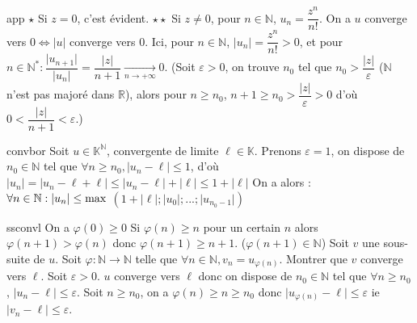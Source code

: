 \documentclass[12pt,a4paper]{report}
\begin{document}
\begin{demonstration}{app}
$\star$ \; Si $z=0$, c'est évident. \newline
$\star \star$ Si $z \neq 0$, pour $n \in \mathbb{N}$, $u_n=\dfrac{z^n}{n!}$.
\newline On a $u$ converge vers $0 \Longleftrightarrow \lvert u \rvert$ converge vers $0$.
\newline Ici, pour $n \in \mathbb{N}$, $\lvert u_n \rvert = \dfrac{z^n}{n!} > 0$, et pour $n \in \mathbb{N}^* : \dfrac{\lvert u_{n+1} \rvert}{\lvert u_n \rvert} = \dfrac{\lvert z \rvert}{n+1} \xrightarrow[n \rightarrow +\infty]{} 0$.
\newline (Soit $\varepsilon > 0$, on trouve $n_0$ tel que $n_0 > \dfrac{\lvert z \rvert}{\varepsilon}$ ($\mathbb{N}$ n'est pas majoré dans $\mathbb{R}$), alors pour $n \geq n_0$, $n+1 \geq n_0 > \dfrac{\lvert z \rvert}{\varepsilon} > 0$ d'où $0 < \dfrac{\lvert z \rvert}{n+1} < \varepsilon$.)
\end{demonstration}

\begin{demonstration}{convbor}
Soit $u \in \mathbb{K}^\mathbb{N}$, convergente de limite $\ell \in \mathbb{K}$. 
\newline Prenons $\varepsilon = 1$, on dispose de $n_0 \in \mathbb{N}$ tel que $\forall n \geq n_0, \lvert u_n - \ell \rvert \leq 1$, 
\newline d'où $\lvert u_n \rvert = \lvert u_n -\ell + \ell \rvert \leq \lvert u_n - \ell \rvert + \lvert \ell \rvert \leq 1 + \lvert \ell \rvert$
\newline On a alors : $\forall n \in \mathbb{N} : \lvert u_n \rvert \leq \rm{max}$ $ (1+ \lvert \ell \rvert ; \lvert u_0 \rvert ; ... ; \lvert u_{n_0-1} \rvert)$
\end{demonstration}

\begin{demonstration}{ssconvl}
On a $\varphi(0) \geq 0$
\newline Si $\varphi(n) \geq n$ pour un certain $n$ alors $\varphi(n+1) > \varphi(n)$ donc $\varphi(n+1) \geq n+1.$ \quad ($\varphi(n+1) \in \mathbb{N}$)
\newline \newline Soit $v$ une sous-suite de $u$. Soit $\varphi : \mathbb{N} \rightarrow \mathbb{N}$ telle que $\forall n \in \mathbb{N}, v_n = u_{\varphi(n)}$.
\newline Montrer que $v$ converge vers $\ell$.
\newline Soit $\varepsilon > 0$. $u$ converge vers $\ell$ donc on dispose de $n_0 \in \mathbb{N}$ tel que $\forall n \geq n_0$, $\lvert u_n - \ell \rvert \leq \varepsilon$.
\newline Soit $n \geq n_0$, on a $\varphi(n) \geq n \geq n_0$ donc $\lvert u_{\varphi(n)} - \ell \rvert \leq \varepsilon$ ie $\lvert v_n - \ell \rvert \leq \varepsilon$.
\end{demonstration}
\end{document}
